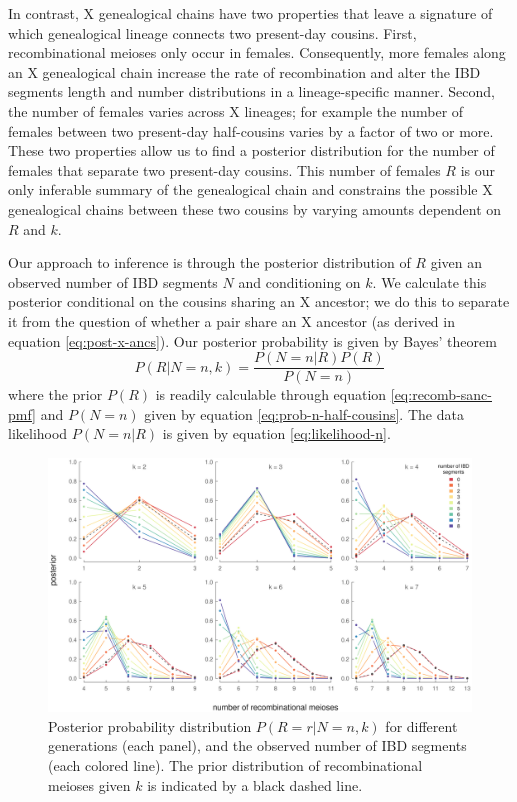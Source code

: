 \documentclass[11pt]{article}
\begin{document}
In contrast, X genealogical chains have two properties that leave a signature
of which genealogical lineage connects two present-day cousins. First,
recombinational meioses only occur in females. Consequently, more females along
an X genealogical chain increase the rate of recombination and alter the IBD
segments length and number distributions in a lineage-specific manner.  Second,
the number of females varies across X lineages; for example the number of
females between two present-day half-cousins varies by a factor of two or more.
These two properties allow us to find a posterior distribution for the number
of females that separate two present-day cousins. This number of females $R$ is
our only inferable summary of the genealogical chain and constrains the
possible X genealogical chains between these two cousins by varying amounts
dependent on $R$ and $k$.

Our approach to inference is through the posterior distribution of $R$ given an
observed number of IBD segments $N$ and conditioning on $k$. We calculate this
posterior conditional on the cousins sharing an X ancestor; we do this to
separate it from the question of whether a pair share an X ancestor (as derived
in equation \eqref{eq:post-x-ancs}). Our posterior probability is given by
Bayes' theorem
%
\begin{equation}
  P(R | N = n, k) = \frac{P(N = n | R) P(R)}{P(N=n)}
\end{equation}
%
where the prior $P(R)$ is readily calculable through equation
\eqref{eq:recomb-sanc-pmf} and $P(N=n)$ given by equation
\eqref{eq:prob-n-half-cousins}. The data likelihood $P(N = n | R)$ is given by
equation \eqref{eq:likelihood-n}.

\begin{figure}[!ht]

  \includegraphics[width=\textwidth]{images/rm-posterior}

  \caption{Posterior probability distribution $P(R = r | N = n, k)$ for
different generations (each panel), and the observed number of IBD segments
(each colored line). The prior distribution of recombinational meioses given
$k$ is indicated by a black dashed line.}

  \label{fig:inference}

\end{figure}
\end{document}
